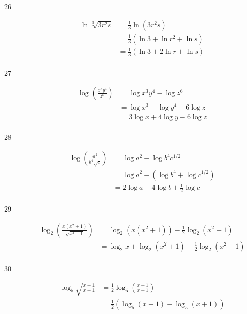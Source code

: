 \documentclass{exam}
\begin{document}
\begin{description}
      \item[26] 
        \begin{align*}
          \ln \sqrt[3]{3 r^2 s} &= \frac{1}{3} \ln \left( 3r^2s \right) \\
                                &= \frac{1}{3} \left( \ln 3 + \ln r^2 + \ln s \right) \\
                                &= \frac{1}{3} \left( \ln 3 + 2 \ln r + \ln s \right) \\
        \end{align*}

      \item[27] 
        \begin{align*}
          \log \left( \frac{x^3y^4}{z^6} \right) &= \log x^3y^4 - \log z^6 \\
                                                 &= \log x^3 + \log y^4 - 6 \log z \\
                                                 &= \boxed{3 \log x + 4 \log y - 6 \log z} \\
        \end{align*}

      \item[28] 
        \begin{align*}
          \log \left( \frac{a^2}{b^4 \sqrt{c}} \right) &= \log a^2 - \log b^4 c^{1/2} \\
                                                       &= \log a^2 - \left( \log b^4 + \log c^{1/2} \right) \\
                                                       &= \boxed{2 \log a - 4 \log b + \frac{1}{2} \log c} \\
        \end{align*}

      \item[29] 
        \begin{align*}
          \log_2 \left( \frac{x \left( x^2 + 1 \right)}{\sqrt{x^2 - 1}} \right)
            &= \log_2 \left( x \left( x^2 + 1 \right) \right) - \frac{1}{2} \log_2 \left( x^2 - 1 \right) \\
            &= \boxed{\log_2 x + \log_2 \left( x^2 + 1 \right) - \frac{1}{2} \log_2 \left( x^2 - 1 \right)} \\
        \end{align*}

      \item[30] 
        \begin{align*}
          \log_5 \sqrt{ \frac{x - 1}{x + 1}} &= \frac{1}{2} \log_5 \left( \frac{x - 1}{x + 1} \right) \\
                                             &= \boxed{\frac{1}{2} \left( \log_5 (x - 1) - \log_5 (x + 1) \right)} \\
        \end{align*}


\end{description}
\end{document}
